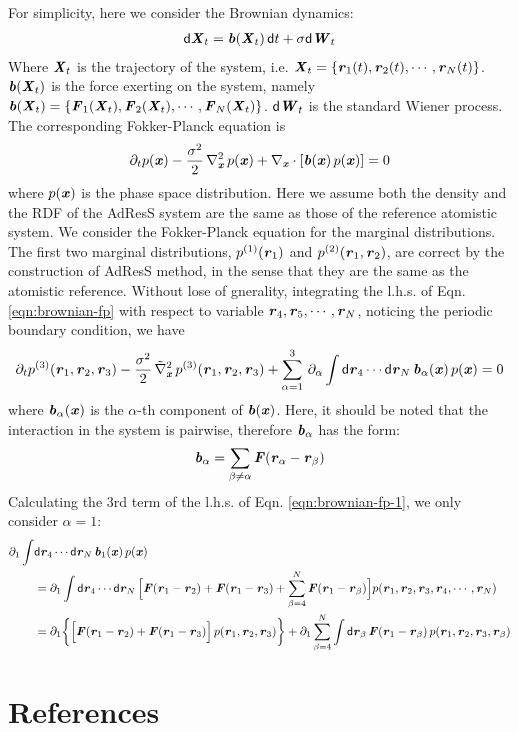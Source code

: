 \documentclass[aip,jcp,a4paper,reprint,onecolumn]{revtex4-1}
\newcommand{\vect}[1]{\textbf{\textit{#1}}}
\newcommand{\dd}[1]{\textsf{#1}}
\begin{document}
For simplicity, here we consider the Brownian dynamics:
\begin{align}
  \dd d \vect X_t = \vect b(\vect X_t)\, \dd d t + \sigma \dd d\vect W_t
\end{align}
Where $\vect X_t$ is the trajectory
of the system, i.e.
$\vect X_t = \{\vect r_1(t), \vect r_2(t), \cdots, \vect r_N(t)\}$.
$\vect b(\vect X_t)$ is the force exerting on the system, namely
$\vect b(\vect X_t) = \{\vect F_1(\vect X_t), \vect F_2(\vect X_t), \cdots,
\vect F_N(\vect X_t)\}$. $\dd d\vect W_t$ is the standard Wiener process.
The corresponding Fokker-Planck equation is
\begin{align}\label{eqn:brownian-fp}
  \partial_t p(\vect x)
  - \frac{\sigma^2}{2}\,\nabla^2_{\vect x}\, p(\vect x) 
  + \nabla_{\vect x}\cdot [\vect b(\vect x) \,p(\vect x)] = 0
\end{align}
where $p(\vect x)$ is the phase space distribution. Here we assume both
the density and the RDF of the AdResS system are the same as those
of the reference atomistic system. We consider the Fokker-Planck equation
for the marginal distributions. The first two marginal distributions,
$p^{(1)}(\vect r_1)$ and $p^{(2)}(\vect r_1, \vect r_2)$, are correct
by the construction of AdResS method, 
in the sense that they are the same as the atomistic reference.
Without lose of gnerality,
integrating the l.h.s. of Eqn. \eqref{eqn:brownian-fp} 
with respect to variable $\vect r_4, \vect r_5, \cdots, \vect r_N$,
noticing the periodic boundary condition,
we have
\begin{align}\label{eqn:brownian-fp-1}
  \partial_t p^{(3)}(\vect r_1, \vect r_2, \vect r_3)
  -
  \frac{\sigma^2}{2} \,\tilde{\nabla}^2_{\vect x}\,
  p^{(3)}(\vect r_1, \vect r_2, \vect r_3)
  +
  \sum_{\alpha=1}^3\,\partial_\alpha\int \dd d\vect r_4\cdots\dd d\vect r_N\,
  \vect b_\alpha(\vect x) \, p(\vect x) = 0
\end{align}
where $\vect b_\alpha(\vect x)$
is the $\alpha$-th component of $\vect b(\vect x)$.
Here, it should be noted that the interaction in the system is
pairwise, therefore $\vect b_\alpha$ has the form:
\begin{align}
  \vect b_\alpha = \sum_{\beta\neq\alpha}\vect F(\vect r_\alpha - \vect r_\beta)
\end{align}
Calculating the 3rd term of the l.h.s. of Eqn. \eqref{eqn:brownian-fp-1},
we only consider $\alpha = 1$:
\begin{align*}
  \partial_1
  \int& \dd d\vect r_4\cdots\dd d\vect r_N\,
  \vect b_1(\vect x) \, p(\vect x) \\
  &=
  \partial_1
  \int \dd d\vect r_4\cdots\dd d\vect r_N\,
  \Big[
  \vect F(\vect r_1 - \vect r_2) +
  \vect F(\vect r_1 - \vect r_3) +
  \sum_{\beta = 4}^N\vect F(\vect r_1 - \vect r_\beta)
  \Big]
  p(\vect r_1, \vect r_2, \vect r_3, \vect r_4, \cdots, \vect r_N)\\
  & =
  \partial_1
  \bigg\{
  \Big[
  \vect F(\vect r_1 - \vect r_2) +
  \vect F(\vect r_1 - \vect r_3)
  \Big]\,
  p (\vect r_1, \vect r_2, \vect r_3)
  \bigg\}
  +
  \partial_1
  \sum_{\beta = 4}^N
  \int \dd d\vect r_\beta\,
  \vect F(\vect r_1 - \vect r_\beta)\,
  p (\vect r_1, \vect r_2, \vect r_3, \vect r_\beta)
\end{align*}



\section*{References}
{}

\end{document}
